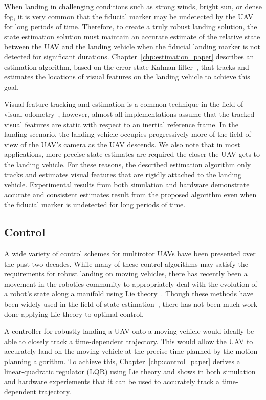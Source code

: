 When landing in challenging conditions such as strong winds, bright sun, or
dense fog, it is very common that the fiducial marker may be undetected by the UAV
for long periods of time. Therefore, to create a truly robust landing solution,
the state estimation solution must maintain an accurate estimate of the relative
state between the UAV and the landing vehicle when the fiducial landing marker
is not detected for significant durations. Chapter~\ref{chp:estimation_paper}
describes an estimation algorithm, based on the error-state Kalman
filter~\cite{roumeliotis1999circumventing}, that tracks and estimates the locations of
visual features on the landing vehicle to achieve this goal.

Visual feature
tracking and estimation is a common technique in the field of visual
odometry~\cite{qin2018vins}, however, almost all implementations assume that the
tracked visual features are static with respect to an inertial reference frame.
In the landing scenario, the landing vehicle occupies progressively more of the
field of view of the UAV's camera as the UAV descends. We also note that in most
applications, more precise state estimates are required the closer the UAV gets
to the landing vehicle. For these reasons, the described estimation algorithm
only tracks and estimates visual features that are rigidly attached to the landing vehicle.
Experimental results
from both simulation and hardware demonstrate accurate and consistent estimates
result from the proposed algorithm even when the fiducial marker is undetected
for long periods of time.

\subsection{Control}
A wide variety of control schemes for multirotor UAVs have been presented over
the past two decades. While many of these control algorithms may satisfy the
requirements for robust landing on moving vehicles, there has recently been a
movement in the robotics community to appropriately deal with the evolution of a
robot's state along a manifold using Lie theory~\cite{sola2018micro}. Though
these methods have been widely used in the field of state
estimation~\cite{sola2017quaternion, koch2017relative}, there has not been much
work done applying Lie theory to optimal control.

A controller for robustly landing a UAV onto a moving vehicle would ideally be able to
closely track a time-dependent trajectory. This would allow the UAV to
accurately land on the moving vehicle at the precise time planned by the motion
planning algorithm. To achieve this, Chapter~\ref{chp:control_paper} derives a
linear-quadratic regulator (LQR) using Lie theory and shows in both simulation
and hardware experiements that it can be used to accurately track a
time-dependent trajectory.

